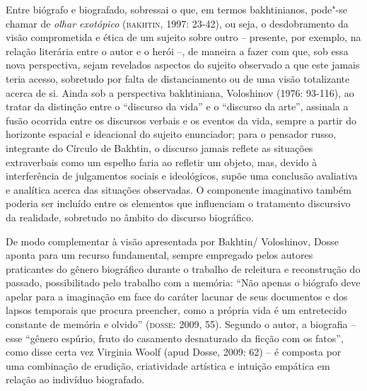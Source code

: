 \documentclass[11pt]{extarticle}
\begin{document}
Entre biógrafo e biografado, sobressai o que, em termos bakhtinianos,
pode"-se chamar de \emph{olhar exotópico} (\textsc{bakhtin}, 1997: 23-42), ou
seja, o desdobramento da visão comprometida e ética de um sujeito sobre
outro -- presente, por exemplo, na relação literária entre o autor e o
herói --, de maneira a fazer com que, sob essa nova perspectiva, sejam
revelados aspectos do sujeito observado a que este jamais teria acesso,
sobretudo por falta de distanciamento ou de uma visão totalizante acerca
de si. Ainda sob a perspectiva bakhtiniana, Voloshinov (1976: 93-116),
ao tratar da distinção entre o ``discurso da vida'' e o ``discurso da
arte'', assinala a fusão ocorrida entre os discursos verbais e os eventos
da vida, sempre a partir do horizonte espacial e ideacional do sujeito
enunciador; para o pensador russo, integrante do Círculo de Bakhtin, o
discurso jamais reflete as situações extraverbais como um espelho faria
ao refletir um objeto, mas, devido à interferência de julgamentos
sociais e ideológicos, supõe uma conclusão avaliativa e analítica acerca
das situações observadas. O componente imaginativo também poderia ser
incluído entre os elementos que influenciam o tratamento discursivo da
realidade, sobretudo no âmbito do discurso biográfico.

De modo complementar à visão apresentada por Bakhtin/ Voloshinov, Dosse
aponta para um recurso fundamental, sempre empregado pelos autores
praticantes do gênero biográfico durante o trabalho de releitura e
reconstrução do passado, possibilitado pelo trabalho com a memória: ``Não
apenas o biógrafo deve apelar para a imaginação em face do caráter
lacunar de seus documentos e dos lapsos temporais que procura preencher,
como a própria vida é um entretecido constante de memória e olvido''
(\textsc{dosse}: 2009, 55). Segundo o autor, a biografia -- esse ``gênero espúrio,
fruto do casamento desnaturado da ficção com os fatos'', como disse certa
vez Virginia Woolf (apud Dosse, 2009: 62) -- é composta por uma
combinação de erudição, criatividade artística e intuição empática em
relação ao indivíduo biografado.
\end{document}

